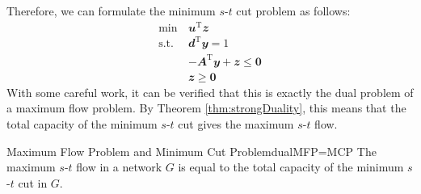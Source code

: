 \documentclass[math, code]{amznotes}
\theoremstyle{remark}
\begin{document}
Therefore, we can formulate the minimum $s$-$t$ cut problem as follows:
\begin{align*}
    \min\,& \mathbfit{u}^{\mathrm{T}}\mathbfit{z} \\
    \textrm{s.t. } & \mathbfit{d}^{\mathrm{T}}\mathbfit{y} = 1 \\
    & -\mathbfit{A}^{\mathrm{T}}\mathbfit{y} + \mathbfit{z} \leq \mathbf{0} \\
    & \mathbfit{z} \geq \mathbf{0}
\end{align*}
With some careful work, it can be verified that this is exactly the dual problem of a maximum flow problem. By Theorem \ref{thm:strongDuality}, this means that the total capacity of the minimum $s$-$t$ cut gives the maximum $s$-$t$ flow.
\begin{probox}{Maximum Flow Problem and Minimum Cut Problem}{dualMFP=MCP}
    The maximum $s$-$t$ flow in a network $G$ is equal to the total capacity of the minimum $s$-$t$ cut in $G$.
\end{probox}
\end{document}
